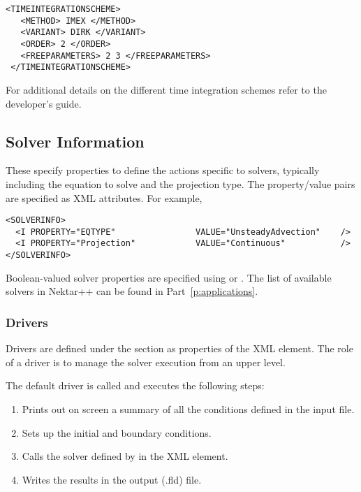 \begin{lstlisting}[style=XMLStyle]
 <TIMEINTEGRATIONSCHEME>
   <METHOD> IMEX </METHOD>
   <VARIANT> DIRK </VARIANT>
   <ORDER> 2 </ORDER>
   <FREEPARAMETERS> 2 3 </FREEPARAMETERS>
 </TIMEINTEGRATIONSCHEME>
\end{lstlisting}

For additional details on the different time integration schemes refer
to the developer's guide.

\subsection{Solver Information}

These specify properties to define the actions specific to solvers,
typically including the equation to solve and the projection type. The
property/value pairs are specified as XML attributes. For example,

\begin{lstlisting}[style=XMLStyle] 
<SOLVERINFO>
  <I PROPERTY="EQTYPE"                VALUE="UnsteadyAdvection"    /> 
  <I PROPERTY="Projection"            VALUE="Continuous"           /> 
</SOLVERINFO>
\end{lstlisting}

Boolean-valued solver properties are specified using  or . The list of available solvers in Nektar++ can be found in
Part~\ref{p:applications}.

\subsubsection{Drivers}
Drivers are defined under the  section as properties of the 
 XML element. The role of a driver is to manage the solver 
execution from an upper level. 

The default driver is called  and executes the following steps:
\begin{enumerate}
\item Prints out on screen a summary of all the conditions defined in the input file.
\item Sets up the initial and boundary conditions.
\item Calls the solver defined by   in the  XML element.
\item Writes the results in the output (.fld) file.
\end{enumerate}

